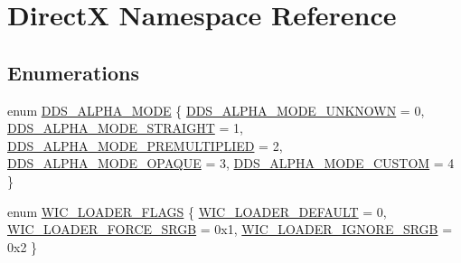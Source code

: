 \hypertarget{namespace_direct_x}{}\section{DirectX Namespace Reference}
\label{namespace_direct_x}
\subsection*{Enumerations}
\begin{DoxyCompactItemize}
\item 
enum \mbox{\hyperlink{namespace_direct_x_a7cb48689d75471680c0bf7f79caaaf1f}{D\+D\+S\+\_\+\+A\+L\+P\+H\+A\+\_\+\+M\+O\+DE}} \{ \newline
\mbox{\hyperlink{namespace_direct_x_a7cb48689d75471680c0bf7f79caaaf1fa9cfa0bbf0542b2d5da9da93e629f50ce}{D\+D\+S\+\_\+\+A\+L\+P\+H\+A\+\_\+\+M\+O\+D\+E\+\_\+\+U\+N\+K\+N\+O\+WN}} = 0, 
\mbox{\hyperlink{namespace_direct_x_a7cb48689d75471680c0bf7f79caaaf1fa3c462f8d7aff2a2590d933fb1dfd6136}{D\+D\+S\+\_\+\+A\+L\+P\+H\+A\+\_\+\+M\+O\+D\+E\+\_\+\+S\+T\+R\+A\+I\+G\+HT}} = 1, 
\mbox{\hyperlink{namespace_direct_x_a7cb48689d75471680c0bf7f79caaaf1facdd00e8572344a8e6d3c4254607d7be8}{D\+D\+S\+\_\+\+A\+L\+P\+H\+A\+\_\+\+M\+O\+D\+E\+\_\+\+P\+R\+E\+M\+U\+L\+T\+I\+P\+L\+I\+ED}} = 2, 
\mbox{\hyperlink{namespace_direct_x_a7cb48689d75471680c0bf7f79caaaf1fa8de87a525290e381f32102aa6a5be7c3}{D\+D\+S\+\_\+\+A\+L\+P\+H\+A\+\_\+\+M\+O\+D\+E\+\_\+\+O\+P\+A\+Q\+UE}} = 3, 
\newline
\mbox{\hyperlink{namespace_direct_x_a7cb48689d75471680c0bf7f79caaaf1fab78d94eee31a6d8a3b97427e0dddb55e}{D\+D\+S\+\_\+\+A\+L\+P\+H\+A\+\_\+\+M\+O\+D\+E\+\_\+\+C\+U\+S\+T\+OM}} = 4
 \}
\item 
enum \mbox{\hyperlink{namespace_direct_x_ad1ef6b84995b08da5a29130bd8cc5c2a}{W\+I\+C\+\_\+\+L\+O\+A\+D\+E\+R\+\_\+\+F\+L\+A\+GS}} \{ \mbox{\hyperlink{namespace_direct_x_ad1ef6b84995b08da5a29130bd8cc5c2aa31db232209a0c414f3c5dd3f36fad240}{W\+I\+C\+\_\+\+L\+O\+A\+D\+E\+R\+\_\+\+D\+E\+F\+A\+U\+LT}} = 0, 
\mbox{\hyperlink{namespace_direct_x_ad1ef6b84995b08da5a29130bd8cc5c2aa19253126a33109ad1e9ca15710a48a71}{W\+I\+C\+\_\+\+L\+O\+A\+D\+E\+R\+\_\+\+F\+O\+R\+C\+E\+\_\+\+S\+R\+GB}} = 0x1, 
\mbox{\hyperlink{namespace_direct_x_ad1ef6b84995b08da5a29130bd8cc5c2aaa411d70404895e65f12c2e6f4216636c}{W\+I\+C\+\_\+\+L\+O\+A\+D\+E\+R\+\_\+\+I\+G\+N\+O\+R\+E\+\_\+\+S\+R\+GB}} = 0x2
 \}
\end{DoxyCompactItemize}
